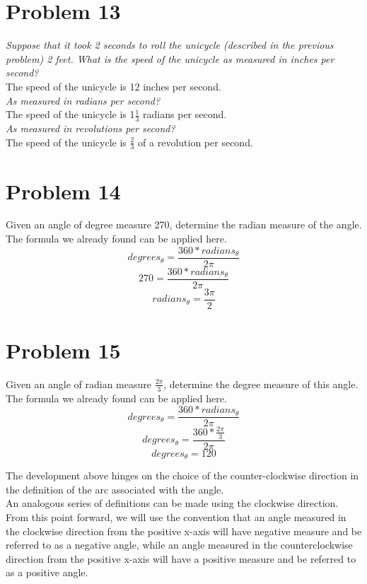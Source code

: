 \documentclass[11pt]{article} %
\newcommand\tab[1][1cm]{\hspace*{#1}}
\begin{document}
\section{Problem 13}
\textit{Suppose that it took 2 seconds to roll the unicycle (described in the previous problem) 2 feet. What is the speed of the unicycle as measured in inches per second?}\\
\tab The speed of the unicycle is 12 inches per second. 
\\ \textit{As measured in radians per second?}\\
\tab The speed of the unicycle is 1$\frac{1}{3}$ radians per second.
\\ \textit{As measured in revolutions per second?}
\\
\tab The speed of the unicycle is $\frac{2}{3}$ of a revolution per second.

\section{Problem 14}
Given an angle of degree measure 270, determine the radian measure of the angle.
\tab The formula we already found can be applied here. 
\begin{displaymath} degrees_\theta = \frac{360*radians_\theta}{2\pi} \end{displaymath} 
\begin{displaymath} 270 = \frac{360*radians_\theta}{2\pi} \end{displaymath} 
\begin{displaymath} radians_\theta = \frac{3\pi}{2} \end{displaymath} 

\section{Problem 15} 
Given an angle of radian measure $\frac{2\pi}{3}$, determine the degree measure of this angle.
\tab The formula we already found can be applied here. 
\begin{displaymath} degrees_\theta = \frac{360*radians_\theta}{2\pi} \end{displaymath} 
\begin{displaymath} degrees_\theta = \frac{360*\frac{2\pi}{3}}{2\pi} \end{displaymath} 
\begin{displaymath} degrees_\theta = 120  \end{displaymath} 

The development above hinges on the choice of the counter-clockwise direction in the definition of the arc associated with the angle. 
\\ \tab An analogous series of definitions can be made using the clockwise direction.
From this point forward, we will use the convention that an angle measured in the clockwise direction from the positive x-axis will have negative measure and be referred to as a negative angle, while an angle measured in the counterclockwise direction from the positive x-axis will have a positive measure and be referred to as a positive angle.
\end{document}
